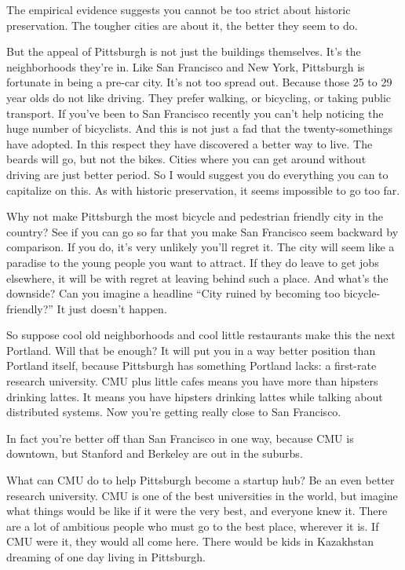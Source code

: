 The empirical evidence suggests you cannot be too strict about historic
preservation. The tougher cities are about it, the better they seem to
do.

But the appeal of Pittsburgh is not just the buildings themselves. It's
the neighborhoods they're in. Like San Francisco and New York,
Pittsburgh is fortunate in being a pre-car city. It's not too spread
out. Because those 25 to 29 year olds do not like driving. They prefer
walking, or bicycling, or taking public transport. If you've been to San
Francisco recently you can't help noticing the huge number of
bicyclists. And this is not just a fad that the twenty-somethings have
adopted. In this respect they have discovered a better way to live. The
beards will go, but not the bikes. Cities where you can get around
without driving are just better period. So I would suggest you do
everything you can to capitalize on this. As with historic preservation,
it seems impossible to go too far.

Why not make Pittsburgh the most bicycle and pedestrian friendly city in
the country? See if you can go so far that you make San Francisco seem
backward by comparison. If you do, it's very unlikely you'll regret it.
The city will seem like a paradise to the young people you want to
attract. If they do leave to get jobs elsewhere, it will be with regret
at leaving behind such a place. And what's the downside? Can you imagine
a headline ``City ruined by becoming too bicycle-friendly?'' It just
doesn't happen.

So suppose cool old neighborhoods and cool little restaurants make this
the next Portland. Will that be enough? It will put you in a way better
position than Portland itself, because Pittsburgh has something Portland
lacks: a first-rate research university. CMU plus little cafes means you
have more than hipsters drinking lattes. It means you have hipsters
drinking lattes while talking about distributed systems. Now you're
getting really close to San Francisco.

In fact you're better off than San Francisco in one way, because CMU is
downtown, but Stanford and Berkeley are out in the suburbs.

What can CMU do to help Pittsburgh become a startup hub? Be an even
better research university. CMU is one of the best universities in the
world, but imagine what things would be like if it were the very best,
and everyone knew it. There are a lot of ambitious people who must go to
the best place, wherever it is. If CMU were it, they would all come
here. There would be kids in Kazakhstan dreaming of one day living in
Pittsburgh.

